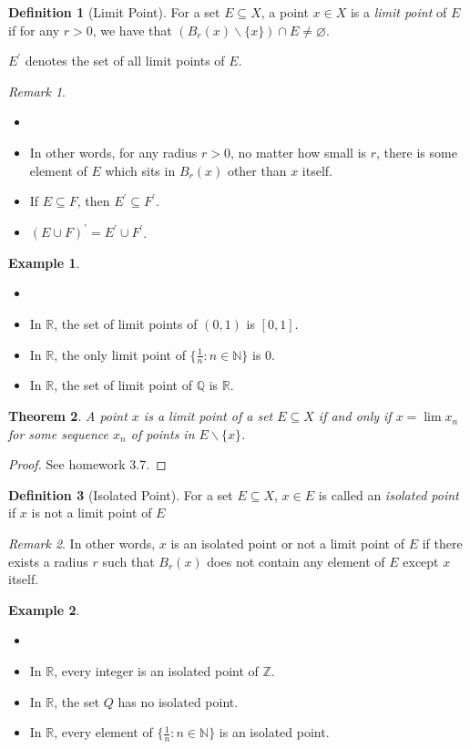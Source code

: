 \documentclass[12pt, lettersize]{book}
\theoremstyle{plain}
\newtheorem{thm}{Theorem}[section]
\theoremstyle{definition}
\newtheorem{dfn}[thm]{Definition}
\newtheorem*{eg}{Example}
\theoremstyle{remark}
\newtheorem*{rem}{Remark}
\newcommand{\R}{\mathbb{R}}
\newcommand{\N}{\mathbb{N}}
\newcommand{\Q}{\mathbb{Q}}
\let\emptyset\varnothing
\begin{document}
		\begin{dfn}[Limit Point]
			For a set $E\subseteq X$, a point $x\in X$ is a \emph{limit point} of $E$ if for any $r>0$, we have that $(B_r(x)\backslash\{x\})\cap E\neq\emptyset$.\smallskip
			
			$E^\prime$ denotes the set of all limit points of $E$.
		\end{dfn}
		\begin{rem}
		\begin{itemize}
			\item[]
			\item In other words, for any radius $r>0$, no matter how small is $r$, there is some element of $E$ which sits in $B_r(x)$ other than $x$ itself. 
			\item If $E\subseteq F$, then $E^\prime\subseteq F^\prime$.
			\item $(E\cup F)^\prime=E^\prime\cup F^\prime$.
		\end{itemize}
		\end{rem}
		\begin{eg}
		\begin{itemize}
			\item[]
			\item In $\R$, the set of limit points of $(0,1)$ is $[0,1]$.
			\item In $\R$, the only limit point of $\{\frac{1}{n}: n\in\N\}$ is $0$.
			\item In $\R$, the set of limit point of $\Q$ is $\R$. 
		\end{itemize}
		\end{eg}
		
		\begin{thm}
		A point $x$ is a limit point of a set $E\subseteq X$ if and only if $x=\lim x_n$ for some sequence $x_n$ of points in $E\backslash\{x\}$. 
		\end{thm}
		\begin{proof}
		See homework 3.7.
		\end{proof}
	
		\begin{dfn}[Isolated Point]
			For a set $E\subseteq X$, $x\in E$ is called an \emph{isolated point} if $x$ is not a limit point of $E$
		\end{dfn}
		\begin{rem}
			In other words, $x$ is an isolated point or not a limit point of $E$ if there exists a radius $r$ such that $B_r(x)$ does not contain any element of $E$ except $x$ itself.
		\end{rem}
		\begin{eg}
		\begin{itemize}
			\item[]
			\item In $\R$, every integer is an isolated point of $\mathbb{Z}$.
			\item In $\R$, the set $Q$ has no isolated point.
			\item In $\R$, every element of $\{\frac{1}{n}: n\in\N\}$ is an isolated point. 
		\end{itemize}
		\end{eg}
	
\end{document}
